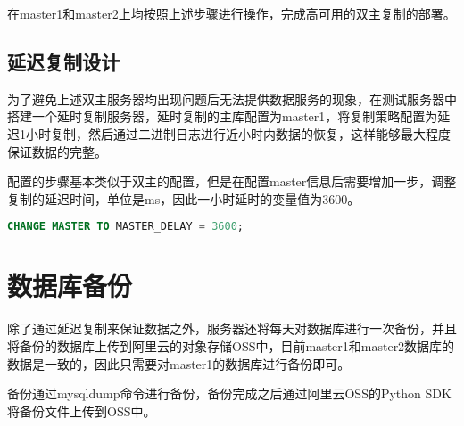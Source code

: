 在master1和master2上均按照上述步骤进行操作，完成高可用的双主复制的部署。
\subsection{延迟复制设计}
为了避免上述双主服务器均出现问题后无法提供数据服务的现象，在测试服务器中搭建一个延时复制服务器，延时复制的主库配置为master1，将复制策略配置为延迟1小时复制，然后通过二进制日志进行近小时内数据的恢复，这样能够最大程度保证数据的完整。

配置的步骤基本类似于双主的配置，但是在配置master信息后需要增加一步，调整复制的延迟时间，单位是ms，因此一小时延时的变量值为3600。

\begin{lstlisting}[language=sql,numbers=none]
CHANGE MASTER TO MASTER_DELAY = 3600;
\end{lstlisting}

\section{数据库备份}
除了通过延迟复制来保证数据之外，服务器还将每天对数据库进行一次备份，并且将备份的数据库上传到阿里云的对象存储OSS中，目前master1和master2数据库的数据是一致的，因此只需要对master1的数据库进行备份即可。

备份通过mysqldump命令进行备份，备份完成之后通过阿里云OSS的Python SDK将备份文件上传到OSS中。

